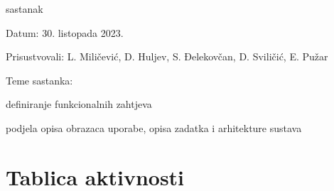\begin{packed_enum}
			\item  sastanak
			\item[] \begin{packed_item}
				\item Datum: 30. listopada 2023.
				\item Prisustvovali: L. Miličević, D. Huljev, S. Đelekovčan, D. Sviličić, E. Pužar
				\item Teme sastanka:
				\begin{packed_item}
					\item  definiranje funkcionalnih zahtjeva
					\item  podjela opisa obrazaca uporabe, opisa zadatka i arhitekture sustava
				\end{packed_item}
			\end{packed_item}
			
			
		\end{packed_enum}
		
		\eject
		\section*{Tablica aktivnosti}
		
			

